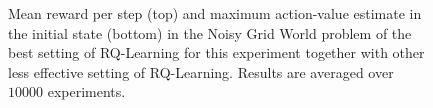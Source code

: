 \begin{figure}[t]
\begin{minipage}{\columnwidth}
\end{minipage}
  \caption[Noisy grid world RQ-Learning variants comparison - 1]{Mean reward per step (top) and maximum action-value estimate in the initial state (bottom) in the Noisy Grid World problem of the best setting of RQ-Learning for this experiment together with other less effective setting of RQ-Learning. Results are averaged over $10000$ experiments.}
  \label{F:hasselt_QDecs}
\end{figure}
